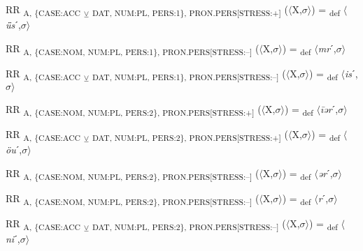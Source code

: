 {\begin{exe}
 RR \textsubscript{A, \{CASE:ACC} \textsubscript{${\veebar}$}\textsubscript{ DAT, NUM:PL, PERS:1\}, PRON.PERS[STRESS:+]} ($\langle$X,$\sigma $$\rangle$) = \textsubscript{def} $\langle$\textit{ǖs}ˊ,$\sigma $$\rangle$
\end{exe}

\begin{exe}
 RR \textsubscript{A, \{CASE:NOM, NUM:PL, PERS:1\}, PRON.PERS[STRESS:–]} ($\langle$X,$\sigma $$\rangle$) = \textsubscript{def} $\langle$\textit{mr}ˊ,$\sigma $$\rangle$
\end{exe}

\begin{exe}
 RR \textsubscript{A, \{CASE:ACC} \textsubscript{${\veebar}$}\textsubscript{ DAT, NUM:PL, PERS:1\}, PRON.PERS[STRESS:–]} ($\langle$X,$\sigma $$\rangle$) = \textsubscript{def} $\langle$\textit{is}ˊ,$\sigma $$\rangle$
\end{exe}

\begin{exe}
 RR \textsubscript{A, \{CASE:NOM, NUM:PL, PERS:2\}, PRON.PERS[STRESS:+]} ($\langle$X,$\sigma $$\rangle$) = \textsubscript{def} $\langle$\textit{\=iər}ˊ,$\sigma $$\rangle$
\end{exe}

\begin{exe}
 RR \textsubscript{A, \{CASE:ACC} \textsubscript{${\veebar}$}\textsubscript{ DAT, NUM:PL, PERS:2\}, PRON.PERS[STRESS:+]} ($\langle$X,$\sigma $$\rangle$) = \textsubscript{def} $\langle$\textit{öu}ˊ,$\sigma $$\rangle$
\end{exe}

\begin{exe}
 RR \textsubscript{A, \{CASE:NOM, NUM:PL, PERS:2\}, PRON.PERS[STRESS:–]} ($\langle$X,$\sigma $$\rangle$) = \textsubscript{def} $\langle$\textit{ər}ˊ,$\sigma $$\rangle$
\end{exe}

\begin{exe}
 RR \textsubscript{A, \{CASE:NOM, NUM:PL, PERS:2\}, PRON.PERS[STRESS:–]} ($\langle$X,$\sigma $$\rangle$) = \textsubscript{def} $\langle$\textit{r}ˊ,$\sigma $$\rangle$
\end{exe}

\begin{exe}
 RR \textsubscript{A, \{CASE:ACC} \textsubscript{${\veebar}$}\textsubscript{ DAT, NUM:PL, PERS:2\}, PRON.PERS[STRESS:–]} ($\langle$X,$\sigma $$\rangle$) = \textsubscript{def} $\langle$\textit{ni}ˊ,$\sigma $$\rangle$
\end{exe}

}
